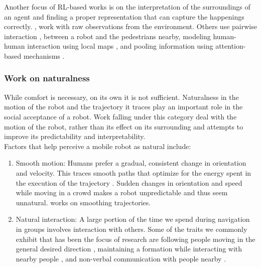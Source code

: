 Another focus of RL-based works is on the interpretation of the surroundings of an agent and finding a proper representation that can capture the happenings correctly. \cite{long_2017_optimally_decentralized_collision_avoidance, tai_paolo_virtual_to_real_2017}, work with raw observations from the environment. Others use pairwise interaction \cite{chen_crowd_aware_robot_nav_with_attention}, \cite{chen_decentralized_non_communication_2017} between a robot and the pedestrians nearby, modeling human-human interaction using local maps \cite{chen_crowd_aware_robot_nav_with_attention}, and pooling information using attention-based mechanisms \cite{chen_crowd_aware_robot_nav_with_attention}.

\subsubsection{Work on naturalness}
While comfort is necessary, on its own it is not sufficient. Naturalness in the motion of the robot and the trajectory it traces play an important role in the social acceptance of a robot. Work falling under this category deal with the motion of the robot, rather than its effect on its surrounding and attempts to improve its predictability and interpretability.\\ %

Factors that help perceive a mobile robot as natural include:
\begin{enumerate}
    \item Smooth motion: Humans prefer a gradual, consistent change in orientation and velocity. This traces smooth paths that optimize for the energy spent in the execution of the trajectory \cite{arechavaleta_nonholonomic_2008}. Sudden changes in orientation and speed while moving in a crowd makes a robot unpredictable and thus seem unnatural. \cite{pandey_alami_robot_guide_2009, pandey_2010_human_centered_nav } works on smoothing trajectories.
    \item Natural interaction: A large portion of the time we spend during navigation in groups involves interaction with others. Some of the traits we commonly exhibit that has been the focus of research are following people moving in the general desired direction \cite{gockley_natural_person_following_2007}, maintaining a formation while interacting with nearby people \cite{althaus_nav_for_human_robot_interaction_2004}, and non-verbal communication with people nearby \cite{sauliner_minimal_nonverbal_interruption_2011}. 
    
\end{enumerate}


